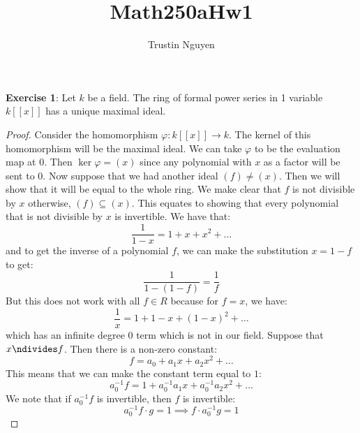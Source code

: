\documentclass{article}
\title{Math250aHw1}
\author{Trustin Nguyen}
\begin{document}
\maketitle

\reversemarginpar

\textbf{Exercise 1}: Let $k$ be a field. The ring of formal power series in 1 variable $k[[x]]$ has a unique maximal ideal.
    \begin{proof}
        Consider the homomorphism $\varphi: k[[x]] \rightarrow k$. The kernel of this homomorphism will be the maximal ideal. We can take $\varphi$ to be the evaluation map at $0$. Then $\ker{\varphi} = (x)$ since any polynomial with $x$ as a factor will be sent to $0$. Now suppose that we had another ideal $(f) \neq (x)$. Then we will show that it will be equal to the whole ring. We make clear that $f$ is not divisible by $x$ otherwise, $(f) \subseteq (x)$. This equates to showing that every polynomial that is not divisible by $x$ is invertible. We have that:
            \begin{equation*}
                \dfrac{1}{1 - x} = 1 + x + x^{2} + \ldots
            \end{equation*}
        and to get the inverse of a polynomial $f$, we can make the substitution $x = 1 - f$ to get:
            \begin{equation*}
                \dfrac{1}{1 - (1 - f)} = \dfrac{1}{f}
            \end{equation*}
        But this does not work with all $f \in R$ because for $f = x$, we have:
            \begin{equation*}
                \dfrac{1}{x} = 1 + 1 - x + (1 - x)^{2} + \ldots
            \end{equation*}
        which has an infinite degree $0$ term which is not in our field. Suppose that $x \ndivides f$. Then there is a non-zero constant:
            \begin{equation*}
                f = a_{0} + a_{1}x + a_{2}x^{2} + \ldots
            \end{equation*}
        This means that we can make the constant term equal to $1$:
            \begin{equation*}
                a_{0}^{-1}f = 1 + a_{0}^{-1}a_{1}x + a_{0}^{-1}a_{2}x^{2} + \ldots
            \end{equation*}
        We note that if $a_{0}^{-1}f$ is invertible, then $f$ is invertible:
            \begin{equation*}
                a_{0}^{-1}f \cdot g = 1 \implies f \cdot a_{0}^{-1}g = 1

\end{equation*}
\end{proof}
\end{document}
